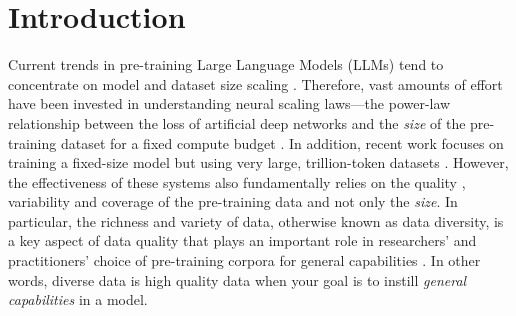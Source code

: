 \section{Introduction}

\label{introduction}
Current trends in pre-training Large Language Models (LLMs) tend to concentrate on model and dataset size scaling \cite{chowdhery2022palm, nostalgebraist2022chinchilla, gpt4, google2023palm2}.
Therefore, vast amounts of effort have been invested in understanding neural scaling laws---the power-law relationship between the loss of artificial deep networks and the \textit{size} of the pre-training dataset for a fixed compute budget \citep{hestness2017deep,rosenfeld2019constructive,henighan2020scaling,kaplan2020scaling,gordon2021data,hernandez2021scaling,jones2021scaling,zhai2022scaling,hoffmann2022training, clark2022unified, neumann2022scaling}.
In addition, recent work focuses on training a fixed-size model but using very large, trillion-token datasets \citep{llama, llamav2}.
However, the effectiveness of these systems also fundamentally relies on the quality \cite{longpre2023pretrainer}, variability and coverage of the pre-training data \cite{tatsu, david2010impossibility} and not only the \textit{size}. 
In particular, the richness and variety of data, otherwise known as data diversity, is a key aspect of data quality that plays an important role in researchers' and practitioners' choice of pre-training corpora for general capabilities \citep{thepile, gpt3, llama, eldan2023tinystories, gunasekar2023textbooks}. 
In other words, diverse data is high quality data when your goal is to instill \textit{general capabilities} in a model. 




